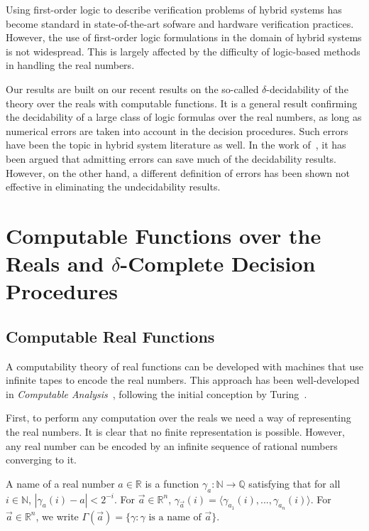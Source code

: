 \documentclass[envcountsect]{llncs}
\begin{document}
Using first-order logic to describe verification problems of hybrid systems has become standard in state-of-the-art sofware and hardware verification practices. However, the use of first-order logic formulations in the domain of hybrid systems is not widespread. This is largely affected by the difficulty of logic-based methods in handling the real numbers. 

Our results are built on our recent results on the so-called $\delta$-decidability of the theory over the reals with computable functions. It is a general result confirming the decidability of a large class of logic formulas over the real numbers, as long as numerical errors are taken into account in the decision procedures. Such errors have been the topic in hybrid system literature as well. In the work of~\cite{}, it has been argued that admitting errors can save much of the decidability results. However, on the other hand, a different definition of errors has been shown not effective in eliminating the undecidability results. 

  


\section{Computable Functions over the Reals and $\delta$-Complete Decision Procedures}

\subsection{Computable Real Functions}

A computability theory of real functions can be developed with machines that use infinite tapes to encode the real numbers. This approach has been well-developed in {\em Computable Analysis}~\cite{CAbook,Kobook,vasco}, following the initial conception by Turing~\cite{}.

First, to perform any computation over the reals we need a way of representing the real numbers. It is clear that no finite representation is possible. However, any real number can be encoded by an infinite sequence of rational numbers converging to it. 
\begin{definition}[Names]
A name of a real number $a\in \mathbb{R}$ is a function $\mathcal{\gamma}_a: \mathbb{N}\rightarrow \mathbb{Q}$ satisfying that for all $i\in \mathbb{N}$, $|\gamma_a(i) - a|<2^{-i}.$ For $\vec a\in \mathbb{R}^n$, $\gamma_{\vec a}(i) = \langle \gamma_{a_1}(i), ..., \gamma_{a_n}(i)\rangle$. For $\vec a\in \mathbb{R}^n$, we write $\Gamma(\vec a) = \{\gamma: \gamma\mbox{ is a name of }\vec a\}$. 
\end{definition}
\end{document}
